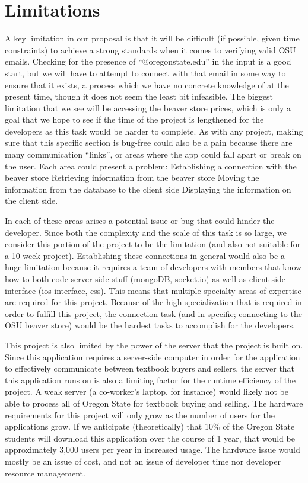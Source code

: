 \documentclass[12pt]{article}
\begin{document}
\section{Limitations}
\par A key limitation in our proposal is that it will be difficult (if possible, given time constraints) to achieve a strong standards when it comes to verifying valid OSU emails. Checking for the presence of “@oregonstate.edu” in the input is a good start, but we will have to attempt to connect with that email in some way to ensure that it exists, a process which we have no concrete knowledge of at the present time, though it does not seem the least bit infeasible. The biggest limitation that we see will be accessing the beaver store prices, which is only a goal that we hope to see if the time of the project is lengthened for the developers as this task would be harder to complete. As with any project, making sure that this specific section is bug-free could also be a pain because there are many communication “links”, or areas where the app could fall apart or break on the user. Each area could present a problem:
Establishing a connection with the beaver store
Retrieving information from the beaver store
Moving the information from the database to the client side
Displaying the information on the client side.
\par In each of these areas arises a potential issue or bug that could hinder the developer. Since both the complexity and the scale of  this task is so large, we consider this portion of the project to be the limitation (and also not suitable for a 10 week project). Establishing these connections in general would also be a huge limitation because it requires a team of developers with members that know how to both code server-side stuff (mongoDB, socket.io) as well as client-side interface (ios interface, css). This means that multiple specialty areas of expertise are required for this project. Because of the high specialization that is required in order to fulfill this project, the connection task (and in specific; connecting to the OSU beaver store) would be the hardest tasks to accomplish for the developers. 
\par This project is also limited by the power of the server that the project is built on. Since this application requires a server-side computer in order for the application to effectively communicate between textbook buyers and sellers, the server that this application runs on is also a limiting factor for the runtime efficiency of the project. A weak server (a co-worker’s laptop, for instance) would likely not be able to process all of Oregon State for textbook buying and selling. The hardware requirements for this project will only grow as the number of users for the applications grow. If we anticipate (theoretically) that 10\% of the Oregon State students will download this application over the course of 1 year, that would be approximately 3,000 users per year in increased usage. The hardware issue would mostly be an issue of cost, and not an issue of developer time nor developer resource management.
\end{document}

